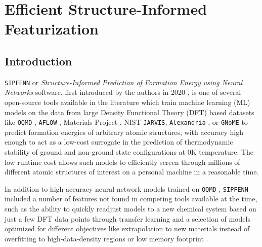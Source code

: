 
\chapter{Efficient Structure-Informed Featurization}

\section{Introduction} \label{pysipfenn:sec:Introduction}

\texttt{SIPFENN} or \textit{Structure-Informed Prediction of Formation Energy using Neural Networks} software, first introduced by the authors in 2020 \cite{Krajewski2022ExtensibleNetworks, Krajewski2020SIPFENNModels}, is one of several open-source tools available in the literature \cite{Ward2017, Jha2019IRNet, Chen2019GraphCrystals, Choudhary2021AtomisticPredictions, Deng2023CHGNetModelling, Davariashtiyani2023FormationRepresentation, Davariashtiyani2023FormationRepresentation, Schmidt2023Machine-Learning-AssistedMaterials} which train machine learning (ML) models on the data from large Density Functional Theory (DFT) based datasets like \texttt{OQMD} \cite{Saal2013MaterialsOQMD, Kirklin2015TheEnergies, Shen2022ReflectionsOQMD}, \texttt{AFLOW} \cite{Curtarolo2013AFLOW:Discovery, Toher2018TheDiscovery}, Materials Project \cite{Jain2013Commentary:Innovation}, NIST-\texttt{JARVIS}\cite{Choudhary2020TheDesign}, \texttt{Alexandria} \cite{Schmidt2022AFunctionals}, or \texttt{GNoME} \cite{Merchant2023ScalingDiscovery} to predict formation energies of arbitrary atomic structures, with accuracy high enough to act as a low-cost surrogate in the prediction of thermodynamic stability of ground and non-ground state configurations at 0K temperature. The low runtime cost allows such models to efficiently screen through millions of different atomic structures of interest on a personal machine in a reasonable time. 

In addition to high-accuracy neural network models trained on \texttt{OQMD} \cite{Saal2013MaterialsOQMD, Kirklin2015TheEnergies, Shen2022ReflectionsOQMD}, \texttt{SIPFENN} included a number of features not found in competing tools available at the time, such as the ability to quickly readjust models to a new chemical system based on just a few DFT data points through transfer learning and a selection of models optimized for different objectives like extrapolation to new materials instead of overfitting to high-data-density regions or low memory footprint \cite{Krajewski2022ExtensibleNetworks}.

